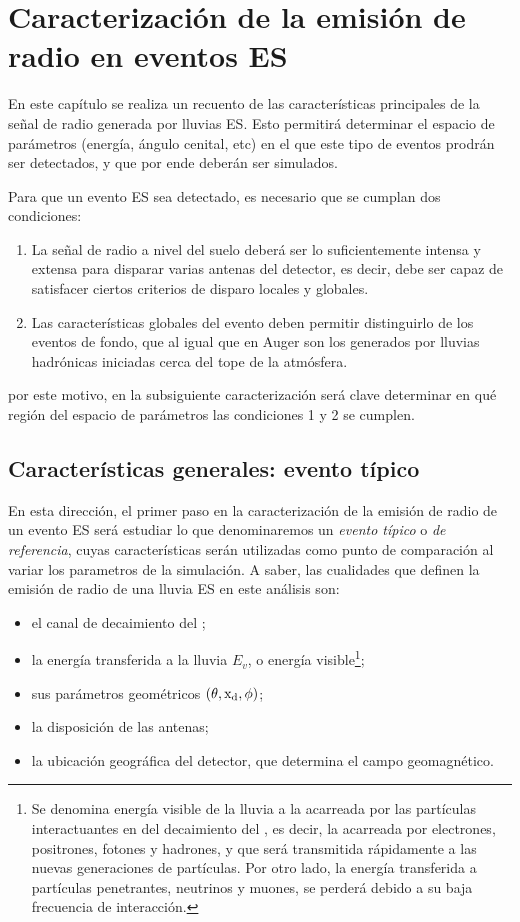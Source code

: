 \chapter{Caracterizaci\'on de la emisi\'on de radio en eventos ES}
\label{ch:caracterizacionRadio}

En este cap\'itulo se realiza un recuento de las caracter\'isticas principales de la se\~nal de radio generada por lluvias ES.
Esto permitir\'a determinar el espacio de par\'ametros (energ\'ia, \'angulo cenital, etc) en el que este tipo de eventos prodr\'an ser detectados, y que por ende deber\'an ser simulados.

Para que un evento ES sea detectado, es necesario que se cumplan dos condiciones:
\begin{enumerate}
 \item La se\~nal de radio a nivel del suelo deber\'a ser lo suficientemente intensa y extensa para disparar varias antenas del detector, es decir, debe ser capaz de satisfacer ciertos criterios de disparo locales y globales.
 \item Las caracter\'isticas globales del evento deben permitir distinguirlo de los eventos de fondo, que al igual que en Auger son los generados por lluvias hadr\'onicas iniciadas cerca del tope de la atm\'osfera.
\end{enumerate}
por este motivo, en la subsiguiente caracterizaci\'on ser\'a clave determinar en qu\'e regi\'on del espacio de par\'ametros las condiciones 1 y 2 se cumplen.

	\section{Caracter\'isticas generales: evento típico}
	
	En esta direcci\'on, el primer paso en la caracterizaci\'on de la emisión de radio de un evento ES ser\'a estudiar lo que denominaremos un \emph{evento típico} o \emph{de referencia}, cuyas caracter\'isticas ser\'an utilizadas como punto de comparaci\'on al variar los parametros de la simulaci\'on. 
	A saber, las cualidades que definen la emisi\'on de radio de una lluvia ES en este an\'alisis son: 
	\begin{itemize}
	 \item el canal de decaimiento del \tauon{};
	 \item la energía transferida a la lluvia $E_v$, o energ\'ia visible\footnote{Se denomina energ\'ia visible de la lluvia a la acarreada por las part\'iculas interactuantes en del decaimiento del \tauon{}, es decir, la acarreada por electrones, positrones, fotones y hadrones, y que ser\'a transmitida r\'apidamente a las nuevas generaciones de part\'iculas. Por otro lado, la energ\'ia transferida a part\'iculas penetrantes, neutrinos y muones, se perder\'a debido a su baja frecuencia de interacci\'on.};
	 \item sus parámetros geométricos $(\theta,{\rm x_d},\phi)$;
	 \item la disposici\'on de las antenas;
	 \item la ubicaci\'on geogr\'afica del detector, que determina el campo geomagn\'etico.
	 
	\end{itemize}


